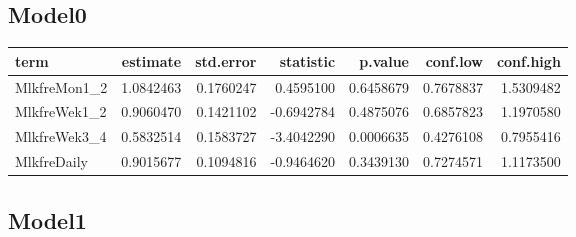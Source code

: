 \documentclass[]{article}
\newenvironment{Shaded}{\begin{snugshade}}{\end{snugshade}}
\newcommand{\DataTypeTok}[1]{\textcolor[rgb]{0.13,0.29,0.53}{#1}}
\newcommand{\KeywordTok}[1]{\textcolor[rgb]{0.13,0.29,0.53}{\textbf{#1}}}
\newcommand{\NormalTok}[1]{#1}
\newcommand{\OperatorTok}[1]{\textcolor[rgb]{0.81,0.36,0.00}{\textbf{#1}}}
\newcommand{\OtherTok}[1]{\textcolor[rgb]{0.56,0.35,0.01}{#1}}
\newcommand{\StringTok}[1]{\textcolor[rgb]{0.31,0.60,0.02}{#1}}
\begin{document}
\hypertarget{model0-7}{%
\subsection{Model0}\label{model0-7}}

\begin{Shaded}
\end{Shaded}

\begin{longtable}[]{@{}lrrrrrr@{}}
\toprule
term & estimate & std.error & statistic & p.value & conf.low &
conf.high\tabularnewline
\midrule
\endhead
MlkfreMon1\_2 & 1.0842463 & 0.1760247 & 0.4595100 & 0.6458679 &
0.7678837 & 1.5309482\tabularnewline
MlkfreWek1\_2 & 0.9060470 & 0.1421102 & -0.6942784 & 0.4875076 &
0.6857823 & 1.1970580\tabularnewline
MlkfreWek3\_4 & 0.5832514 & 0.1583727 & -3.4042290 & 0.0006635 &
0.4276108 & 0.7955416\tabularnewline
MlkfreDaily & 0.9015677 & 0.1094816 & -0.9464620 & 0.3439130 & 0.7274571
& 1.1173500\tabularnewline
\bottomrule
\end{longtable}

\hypertarget{model1-7}{%
\subsection{Model1}\label{model1-7}}

\begin{Shaded}
\end{Shaded}
\end{document}
